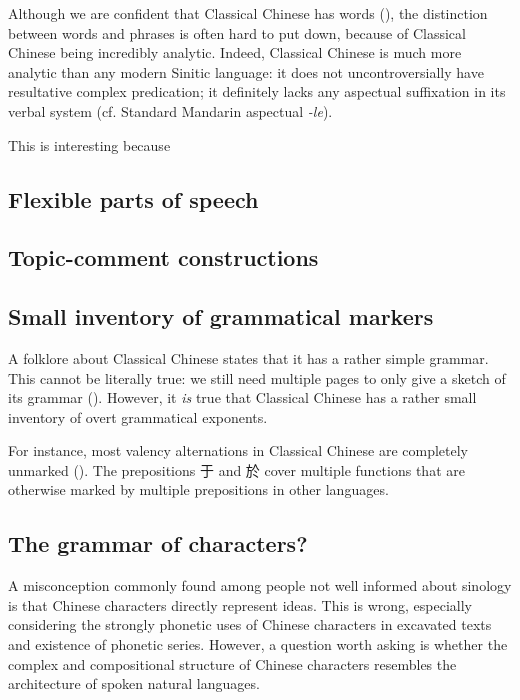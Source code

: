 \documentclass[UTF8, a4paper, oneside, scheme=plain, 12pt]{ctexrep}
\newcommand{\form}[1]{\emph{#1}}
\begin{document}
Although we are confident that Classical Chinese has words (),
the distinction between words and phrases is often hard to put down,
because of Classical Chinese being incredibly analytic.
Indeed, Classical Chinese is much more analytic than any modern Sinitic language:
it does not uncontroversially have resultative complex predication;
it definitely lacks any aspectual suffixation in its verbal system 
(cf. Standard Mandarin aspectual \form{-le}).

This is interesting because 

\subsection{Flexible parts of speech}



\subsection{Topic-comment constructions}

\subsection{Small inventory of grammatical markers}

A folklore about Classical Chinese states that it has a rather simple grammar.
This cannot be literally true: we still need multiple pages to only give a sketch of its grammar ().
However, it \emph{is} true that Classical Chinese has a rather small inventory of overt grammatical exponents.

For instance, most valency alternations in Classical Chinese are completely unmarked ().
The prepositions 于 and 於 cover multiple functions that are otherwise marked by multiple prepositions in other languages.



\subsection{The grammar of characters?}\label{sec:writing-system.theoretical}

A misconception commonly found among people not well informed about sinology
is that Chinese characters directly represent ideas.
This is wrong, especially considering the strongly phonetic uses of Chinese characters in excavated texts and existence of phonetic series.
However, a question worth asking is whether the complex and compositional structure of Chinese characters resembles the architecture of spoken natural languages.
\end{document}
